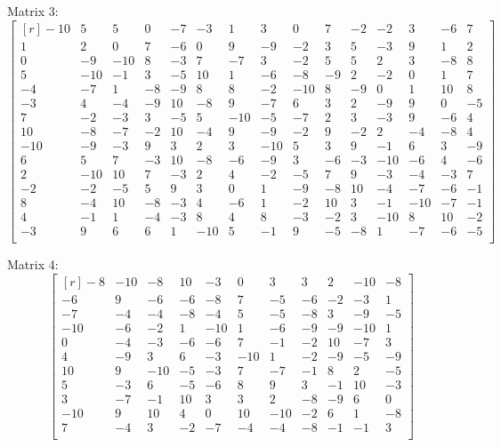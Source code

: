 \documentclass[a4paper]{article}
\begin{document}
			Matrix 3:
			$$\begin{bmatrix}[r]
				-10 & 5 & 5 & 0 & -7 & -3 & 1 & 3 & 0 & 7 & -2 & -2 & 3 & -6 & 7 \\
				1 & 2 & 0 & 7 & -6 & 0 & 9 & -9 & -2 & 3 & 5 & -3 & 9 & 1 & 2 \\
				0 & -9 & -10 & 8 & -3 & 7 & -7 & 3 & -2 & 5 & 5 & 2 & 3 & -8 & 8 \\
				5 & -10 & -1 & 3 & -5 & 10 & 1 & -6 & -8 & -9 & 2 & -2 & 0 & 1 & 7 \\
				-4 & -7 & 1 & -8 & -9 & 8 & 8 & -2 & -10 & 8 & -9 & 0 & 1 & 10 & 8 \\
				-3 & 4 & -4 & -9 & 10 & -8 & 9 & -7 & 6 & 3 & 2 & -9 & 9 & 0 & -5 \\
				7 & -2 & -3 & 3 & -5 & 5 & -10 & -5 & -7 & 2 & 3 & -3 & 9 & -6 & 4 \\
				10 & -8 & -7 & -2 & 10 & -4 & 9 & -9 & -2 & 9 & -2 & 2 & -4 & -8 & 4 \\
				-10 & -9 & -3 & 9 & 3 & 2 & 3 & -10 & 5 & 3 & 9 & -1 & 6 & 3 & -9 \\
				6 & 5 & 7 & -3 & 10 & -8 & -6 & -9 & 3 & -6 & -3 & -10 & -6 & 4 & -6 \\
				2 & -10 & 10 & 7 & -3 & 2 & 4 & -2 & -5 & 7 & 9 & -3 & -4 & -3 & 7 \\
				-2 & -2 & -5 & 5 & 9 & 3 & 0 & 1 & -9 & -8 & 10 & -4 & -7 & -6 & -1 \\
				8 & -4 & 10 & -8 & -3 & 4 & -6 & 1 & -2 & 10 & 3 & -1 & -10 & -7 & -1 \\
				4 & -1 & 1 & -4 & -3 & 8 & 4 & 8 & -3 & -2 & 3 & -10 & 8 & 10 & -2 \\
				-3 & 9 & 6 & 6 & 1 & -10 & 5 & -1 & 9 & -5 & -8 & 1 & -7 & -6 & -5 \\
			\end{bmatrix}$$
			
			Matrix 4:
			$$\begin{bmatrix}[r]
				-8 & -10 & -8 & 10 & -3 & 0 & 3 & 3 & 2 & -10 & -8 \\
				-6 & 9 & -6 & -6 & -8 & 7 & -5 & -6 & -2 & -3 & 1 \\
				-7 & -4 & -4 & -8 & -4 & 5 & -5 & -8 & 3 & -9 & -5 \\
				-10 & -6 & -2 & 1 & -10 & 1 & -6 & -9 & -9 & -10 & 1 \\
				0 & -4 & -3 & -6 & -6 & 7 & -1 & -2 & 10 & -7 & 3 \\
				4 & -9 & 3 & 6 & -3 & -10 & 1 & -2 & -9 & -5 & -9 \\
				10 & 9 & -10 & -5 & -3 & 7 & -7 & -1 & 8 & 2 & -5 \\
				5 & -3 & 6 & -5 & -6 & 8 & 9 & 3 & -1 & 10 & -3 \\
				3 & -7 & -1 & 10 & 3 & 3 & 2 & -8 & -9 & 6 & 0 \\
				-10 & 9 & 10 & 4 & 0 & 10 & -10 & -2 & 6 & 1 & -8 \\
				7 & -4 & 3 & -2 & -7 & -4 & -4 & -8 & -1 & -1 & 3 \\
			\end{bmatrix}$$
			
\end{document}
